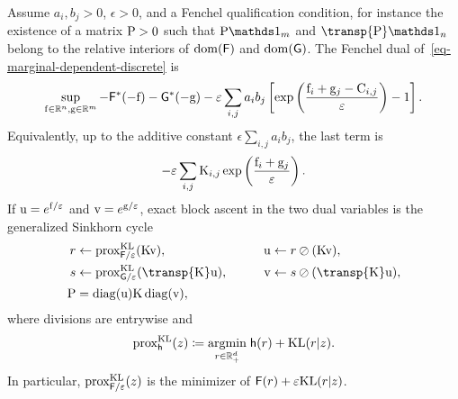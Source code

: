 \begin{prop}\label{prop-marginal-dependent-dual-scaling}
Assume $a_i,b_j>0$, $\epsilon>0$, and a Fenchel qualification condition, for instance the existence of a matrix $\P>0$ such that $\P\ones_m$ and $\transp{\P}\ones_n$ belong to the relative interiors of $\dom(\mathsf F)$ and $\dom(\mathsf G)$. The Fenchel dual of~\eqref{eq-marginal-dependent-discrete} is
\begin{equation}\label{eq-marginal-dependent-dual}
	\sup_{\fD\in\RR^n,\gD\in\RR^m}
	-
	\mathsf F^*(-\fD)
	-
	\mathsf G^*(-\gD)
	-
	\epsilon\sum_{i,j}a_i b_j
	\left[
		\exp\left(\frac{\fD_i+\gD_j-\C_{i,j}}{\epsilon}\right)-1
	\right].
\end{equation}
Equivalently, up to the additive constant $\epsilon\sum_{i,j}a_i b_j$, the last term is
\[
	-
	\epsilon\sum_{i,j}\K_{i,j}
	\exp\left(\frac{\fD_i+\gD_j}{\epsilon}\right).
\]
If $\uD=e^{\fD/\epsilon}$ and $\vD=e^{\gD/\epsilon}$, exact block ascent in the two dual variables is the generalized Sinkhorn cycle
\begin{equation}\label{eq-generalized-sinkhorn-kl-prox}
\begin{aligned}
	r &\leftarrow \prox_{\mathsf F/\epsilon}^{\KLD}(\K\vD),
	&\qquad
	\uD &\leftarrow r\oslash(\K\vD),\\
	s &\leftarrow \prox_{\mathsf G/\epsilon}^{\KLD}(\transp{\K}\uD),
	&\qquad
	\vD &\leftarrow s\oslash(\transp{\K}\uD),\\
	\P&=\diag(\uD)\K\diag(\vD),
\end{aligned}
\end{equation}
where divisions are entrywise and
\begin{equation}\label{eq-kl-prox-marginal}
	\prox_{\mathsf h}^{\KLD}(z)
	\eqdef
	\uargmin{r\in\RR_+^d}
	\mathsf h(r)+\KLD(r|z).
\end{equation}
In particular, $\prox_{\mathsf F/\epsilon}^{\KLD}(z)$ is the minimizer of $\mathsf F(r)+\epsilon\KLD(r|z)$.
\end{prop}

